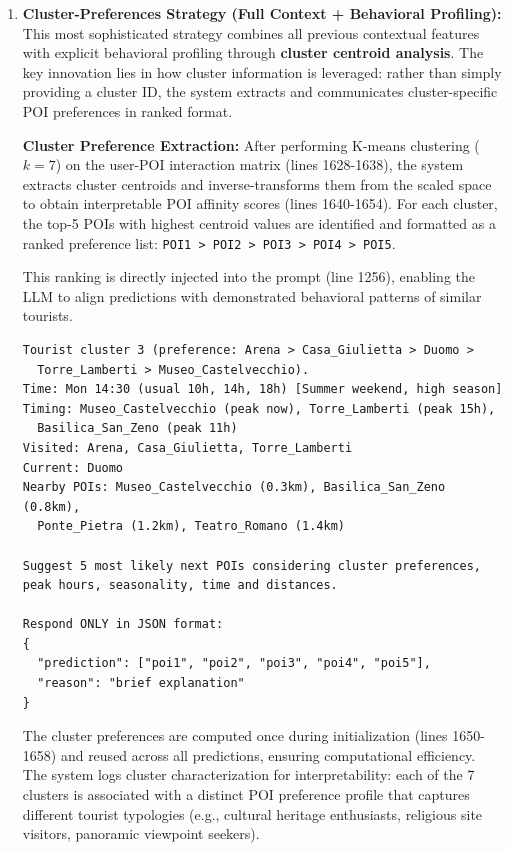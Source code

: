 \documentclass{article}
\begin{document}
\begin{enumerate}
\item \textbf{Cluster-Preferences Strategy (Full Context + Behavioral Profiling):}
This most sophisticated strategy combines all previous contextual features with explicit behavioral profiling through \textbf{cluster centroid analysis}. The key innovation lies in how cluster information is leveraged: rather than simply providing a cluster ID, the system extracts and communicates cluster-specific POI preferences in ranked format.

\textbf{Cluster Preference Extraction:} After performing K-means clustering ($k=7$) on the user-POI interaction matrix (lines 1628-1638), the system extracts cluster centroids and inverse-transforms them from the scaled space to obtain interpretable POI affinity scores (lines 1640-1654). For each cluster, the top-5 POIs with highest centroid values are identified and formatted as a ranked preference list: \texttt{POI1 > POI2 > POI3 > POI4 > POI5}.

This ranking is directly injected into the prompt (line 1256), enabling the LLM to align predictions with demonstrated behavioral patterns of similar tourists.

\begin{lstlisting}[caption=Cluster-Preferences Prompt Template]
Tourist cluster 3 (preference: Arena > Casa_Giulietta > Duomo >
  Torre_Lamberti > Museo_Castelvecchio).
Time: Mon 14:30 (usual 10h, 14h, 18h) [Summer weekend, high season]
Timing: Museo_Castelvecchio (peak now), Torre_Lamberti (peak 15h),
  Basilica_San_Zeno (peak 11h)
Visited: Arena, Casa_Giulietta, Torre_Lamberti
Current: Duomo
Nearby POIs: Museo_Castelvecchio (0.3km), Basilica_San_Zeno (0.8km),
  Ponte_Pietra (1.2km), Teatro_Romano (1.4km)

Suggest 5 most likely next POIs considering cluster preferences,
peak hours, seasonality, time and distances.

Respond ONLY in JSON format:
{
  "prediction": ["poi1", "poi2", "poi3", "poi4", "poi5"],
  "reason": "brief explanation"
}
\end{lstlisting}

The cluster preferences are computed once during initialization (lines 1650-1658) and reused across all predictions, ensuring computational efficiency. The system logs cluster characterization for interpretability: each of the 7 clusters is associated with a distinct POI preference profile that captures different tourist typologies (e.g., cultural heritage enthusiasts, religious site visitors, panoramic viewpoint seekers).

\end{enumerate}
\end{document}
